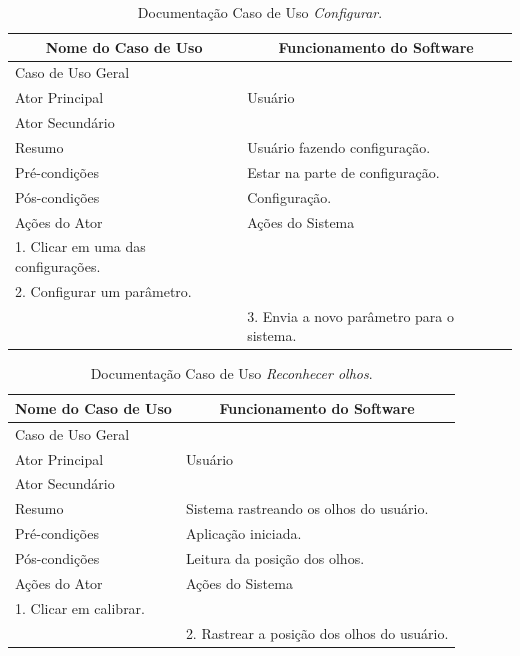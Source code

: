 \begin{longtable}{|l|l|}
\caption{Documentação Caso de Uso \textit{Configurar}.} \label{tab:dcu-1} \\
\hline 
\multicolumn{1}{|c|}{\textbf{Nome do Caso de Uso}} & 
\multicolumn{1}{c|}{\textbf{Funcionamento do Software}} \\ \hline 
\endfirsthead
\hline
Caso de Uso Geral &  \\ \hline
Ator Principal & Usuário\\ \hline
Ator Secundário & \\ \hline
Resumo & Usuário fazendo configuração. \\ \hline 
Pré-condições &  Estar na parte de configuração. \\ \hline 
Pós-condições &  Configuração. \\ \hline
 Ações do Ator& Ações do Sistema \\ \hline
 1.	Clicar em uma das configurações.&  \\ \hline
 2.	Configurar um parâmetro.&  \\ \hline
 & 3. Envia a novo parâmetro para o sistema. \\ \hline
\end{longtable}

\begin{longtable}{|l|l|}
\caption{Documentação Caso de Uso \textit{Reconhecer olhos}.} \label{tab:dcu-1} \\
\hline 
\multicolumn{1}{|c|}{\textbf{Nome do Caso de Uso}} & 
\multicolumn{1}{c|}{\textbf{Funcionamento do Software}} \\ \hline 
\endfirsthead
\hline
Caso de Uso Geral &  \\ \hline
Ator Principal & Usuário\\ \hline
Ator Secundário & \\ \hline
Resumo & Sistema rastreando os olhos do usuário. \\ \hline 
Pré-condições &  Aplicação iniciada. \\ \hline 
Pós-condições &  Leitura da posição dos olhos. \\ \hline
 Ações do Ator& Ações do Sistema \\ \hline
 1.	Clicar em calibrar.&  \\ \hline
 & 2. Rastrear a posição dos olhos do usuário. \\ \hline
\end{longtable}

